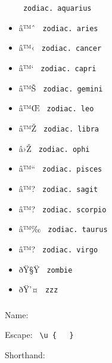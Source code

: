 \begin{itemize}
{  \texttt{\ zodiac.\ aquarius\ }}
\item
  \label{symbol-zodiac.aries}{{ â™ˆ }
  \texttt{\ zodiac.\ aries\ }}
\item
  \label{symbol-zodiac.cancer}{{ â™‹ }
  \texttt{\ zodiac.\ cancer\ }}
\item
  \label{symbol-zodiac.capri}{{ â™` }
  \texttt{\ zodiac.\ capri\ }}
\item
  \label{symbol-zodiac.gemini}{{ â™Š }
  \texttt{\ zodiac.\ gemini\ }}
\item
  \label{symbol-zodiac.leo}{{ â™Œ }
  \texttt{\ zodiac.\ leo\ }}
\item
  \label{symbol-zodiac.libra}{{ â™Ž }
  \texttt{\ zodiac.\ libra\ }}
\item
  \label{symbol-zodiac.ophi}{{ â›Ž }
  \texttt{\ zodiac.\ ophi\ }}
\item
  \label{symbol-zodiac.pisces}{{ â™`` }
  \texttt{\ zodiac.\ pisces\ }}
\item
  \label{symbol-zodiac.sagit}{{ â™? }
  \texttt{\ zodiac.\ sagit\ }}
\item
  \label{symbol-zodiac.scorpio}{{ â™? }
  \texttt{\ zodiac.\ scorpio\ }}
\item
  \label{symbol-zodiac.taurus}{{ â™‰ }
  \texttt{\ zodiac.\ taurus\ }}
\item
  \label{symbol-zodiac.virgo}{{ â™? }
  \texttt{\ zodiac.\ virgo\ }}
\item
  \label{symbol-zombie}{{ ðŸ§Ÿ } \texttt{\ zombie\ }}
\item
  \label{symbol-zzz}{{ ðŸ'¤ } \texttt{\ zzz\ }}
\end{itemize}

{ }

\subsubsection{\texorpdfstring{{ }}{ }}\label{section}

Name: \texttt{\ }


Escape: \texttt{\ \textbackslash{}u\ \{\ }{\texttt{\ }}\texttt{\ \}\ }


Shorthand: \texttt{\ }

{ }


